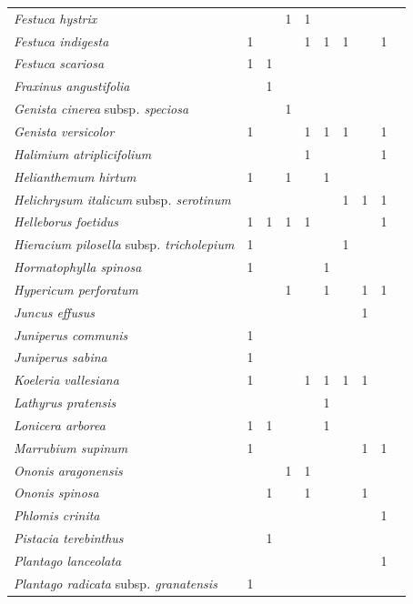 {\begin{longtable}{llllllllll}
\textit{Festuca hystrix}  &  &  & 1 & 1 &  &  &  &  \\
\textit{Festuca indigesta}  & 1 &  &  & 1 & 1 & 1 &  & 1 \\
\textit{Festuca scariosa}  & 1 & 1 &  &  &  &  &  &  \\
\textit{Fraxinus angustifolia}  &  & 1 &  &  &  &  &  &  \\
\textit{Genista cinerea }subsp\textit{. speciosa}  &  &  & 1 &  &  &  &  &  \\
\textit{Genista versicolor}  & 1 &  &  & 1 & 1 & 1 &  & 1 \\
\textit{Halimium atriplicifolium}  &  &  &  & 1 &  &  &  & 1 \\
\textit{Helianthemum hirtum}  & 1 &  & 1 &  & 1 &  &  &  \\
\textit{Helichrysum italicum }subsp\textit{. serotinum}  &  &  &  &  &  & 1 & 1 & 1 \\
\textit{Helleborus foetidus}  & 1 & 1 & 1 & 1 &  &  &  & 1 \\
\textit{Hieracium pilosella }subsp\textit{. tricholepium}  & 1 &  &  &  &  & 1 &  &  \\
\textit{Hormatophylla spinosa}  & 1 &  &  &  & 1 &  &  &  \\
\textit{Hypericum perforatum}  &  &  & 1 &  & 1 &  & 1 & 1 \\
\textit{Juncus effusus}  &  &  &  &  &  &  & 1 &  \\
\textit{Juniperus communis}  & 1 &  &  &  &  &  &  &  \\
\textit{Juniperus sabina}  & 1 &  &  &  &  &  &  &  \\
\textit{Koeleria vallesiana}  & 1 &  &  & 1 & 1 & 1 & 1 &  \\
\textit{Lathyrus pratensis}  &  &  &  &  & 1 &  &  &  \\
\textit{Lonicera arborea}  & 1 & 1 &  &  & 1 &  &  &  \\
\textit{Marrubium supinum}  & 1 &  &  &  &  &  & 1 & 1 \\
\textit{Ononis aragonensis}  &  &  & 1 & 1 &  &  &  &  \\
\textit{Ononis spinosa}  &  & 1 &  & 1 &  &  & 1 &  \\
\textit{Phlomis crinita}  &  &  &  &  &  &  &  & 1 \\
\textit{Pistacia terebinthus}  &  & 1 &  &  &  &  &  &  \\
\textit{Plantago lanceolata}  &  &  &  &  &  &  &  & 1 \\
\textit{Plantago radicata }subsp\textit{. granatensis}  & 1 &  &  &  &  &  &  &  \\

\end{longtable}}
